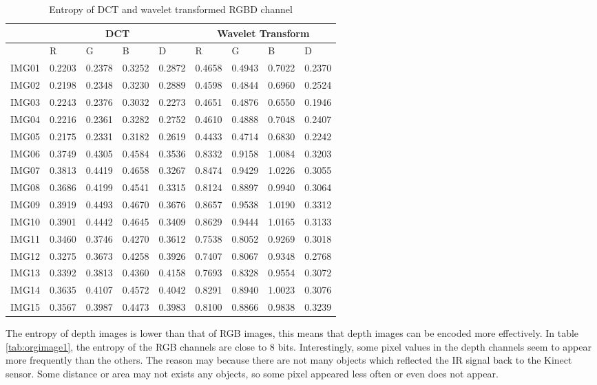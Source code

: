\begin{table*}
\center
\begin{tabular}{|l|l|l|l|l|l|l|l|l|}\hline
& \multicolumn{4}{|c|}{DCT} & \multicolumn{4}{|c|}{Wavelet Transform} \\\hline
& R & G & B & D & R & G & B & D  \\\hline
IMG01 & 0.2203 & 0.2378 & 0.3252 & 0.2872 & 0.4658 & 0.4943 & 0.7022 & 0.2370 \\\hline
IMG02 & 0.2198 & 0.2348 & 0.3230 & 0.2889 & 0.4598 & 0.4844 & 0.6960 & 0.2524 \\\hline
IMG03 & 0.2243 & 0.2376 & 0.3032 & 0.2273 & 0.4651 & 0.4876 & 0.6550 & 0.1946 \\\hline
IMG04 & 0.2216 & 0.2361 & 0.3282 & 0.2752 & 0.4610 & 0.4888 & 0.7048 & 0.2407 \\\hline
IMG05 & 0.2175 & 0.2331 & 0.3182 & 0.2619 & 0.4433 & 0.4714 & 0.6830 & 0.2242 \\\hline
IMG06 & 0.3749 & 0.4305 & 0.4584 & 0.3536 & 0.8332 & 0.9158 & 1.0084 & 0.3203 \\\hline
IMG07 & 0.3813 & 0.4419 & 0.4658 & 0.3267 & 0.8474 & 0.9429 & 1.0226 & 0.3055 \\\hline
IMG08 & 0.3686 & 0.4199 & 0.4541 & 0.3315 & 0.8124 & 0.8897 & 0.9940 & 0.3064 \\\hline
IMG09 & 0.3919 & 0.4493 & 0.4670 & 0.3676 & 0.8657 & 0.9538 & 1.0190 & 0.3312 \\\hline
IMG10 & 0.3901 & 0.4442 & 0.4645 & 0.3409 & 0.8629 & 0.9444 & 1.0165 & 0.3133 \\\hline
IMG11 & 0.3460 & 0.3746 & 0.4270 & 0.3612 & 0.7538 & 0.8052 & 0.9269 & 0.3018 \\\hline
IMG12 & 0.3275 & 0.3673 & 0.4258 & 0.3926 & 0.7407 & 0.8067 & 0.9348 & 0.2768 \\\hline
IMG13 & 0.3392 & 0.3813 & 0.4360 & 0.4158 & 0.7693 & 0.8328 & 0.9554 & 0.3072 \\\hline
IMG14 & 0.3635 & 0.4107 & 0.4572 & 0.4042 & 0.8291 & 0.8940 & 1.0023 & 0.3076 \\\hline
IMG15 & 0.3567 & 0.3987 & 0.4473 & 0.3983 & 0.8100 & 0.8866 & 0.9838 & 0.3239 \\\hline
\end{tabular}
\caption{Entropy of DCT and wavelet transformed RGBD channel}
\label{tab:entropy}
\end{table*}

The entropy of depth images is lower than that of RGB images, this means that depth 
images can be encoded more effectively. In table \ref{tab:orgimage1}, the entropy of the RGB channels are close to 8 bits. 
Interestingly, some pixel values in the depth channels seem to appear more frequently than the others. The reason may because there are not many objects which reflected the IR signal back to the Kinect sensor. 
Some distance or area may not exists any objects, so some pixel appeared less often or even does not appear.


